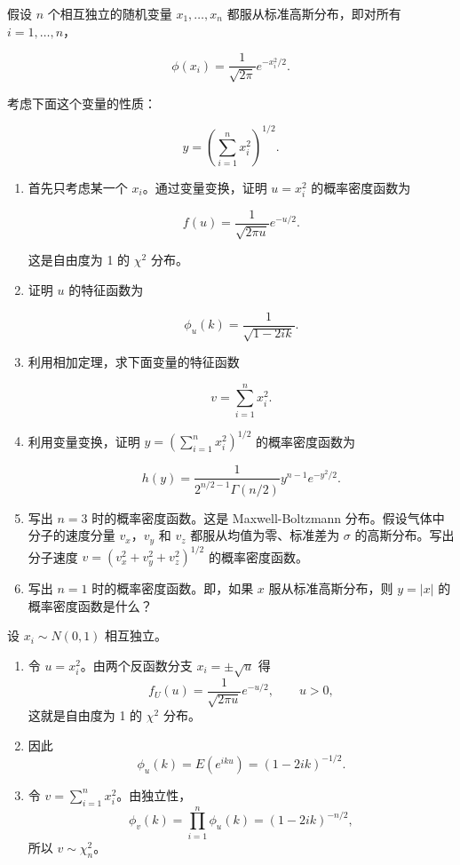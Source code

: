 \begin{question}
假设 \(n\) 个相互独立的随机变量 \(x_1,\ldots,x_n\)
都服从标准高斯分布，即对所有 \(i=1,\ldots,n\)，

\[
\phi(x_i)=\frac{1}{\sqrt{2\pi}}e^{-x_i^2/2}.
\]

考虑下面这个变量的性质：

\[
y=\left(\sum_{i=1}^{n}x_i^2\right)^{1/2}.
\]

\begin{enumerate}
\item 首先只考虑某一个 \(x_i\)。通过变量变换，证明 \(u=x_i^2\)
的概率密度函数为

\[
f(u)=\frac{1}{\sqrt{2\pi u}}e^{-u/2}.
\]

这是自由度为 1 的 \(\chi^2\) 分布。

\item 证明 \(u\) 的特征函数为

\[
\phi_u(k)=\frac{1}{\sqrt{1-2ik}}.
\]

\item 利用相加定理，求下面变量的特征函数

\[
v=\sum_{i=1}^{n}x_i^2.
\]

\item 利用变量变换，证明 \(y=\left(\sum_{i=1}^{n}x_i^2\right)^{1/2}\)
的概率密度函数为

\[
h(y)=\frac{1}{2^{n/2-1}\Gamma(n/2)}y^{n-1}e^{-y^2/2}.
\]

\item 写出 \(n=3\) 时的概率密度函数。这是 Maxwell-Boltzmann
分布。假设气体中分子的速度分量 \(v_x\)，\(v_y\) 和 \(v_z\)
都服从均值为零、标准差为 \(\sigma\) 的高斯分布。写出分子速度
\(v=(v_x^2+v_y^2+v_z^2)^{1/2}\) 的概率密度函数。

\item 写出 \(n=1\) 时的概率密度函数。即，如果 \(x\) 服从标准高斯分布，则
\(y=|x|\) 的概率密度函数是什么？
\end{enumerate}
\begin{solution}
设 \(x_i\sim N(0,1)\) 相互独立。

\begin{enumerate}
\item 令 \(u=x_i^2\)。由两个反函数分支 \(x_i=\pm\sqrt u\) 得
\[
f_U(u)=\frac{1}{\sqrt{2\pi u}}e^{-u/2},\qquad u>0,
\]
这就是自由度为 1 的 \(\chi^2\) 分布。

\item 因此
\[
\phi_u(k)=E(e^{iku})=(1-2ik)^{-1/2}.
\]

\item 令 \(v=\sum_{i=1}^n x_i^2\)。由独立性，
\[
\phi_v(k)=\prod_{i=1}^n\phi_u(k)=(1-2ik)^{-n/2},
\]
所以 \(v\sim\chi_n^2\)。


\end{enumerate}
\end{solution}
\end{question}
